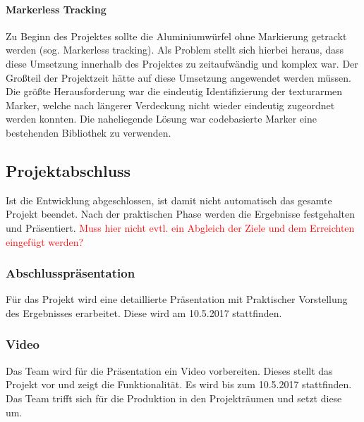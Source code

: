 \paragraph{Markerless Tracking}
 Zu Beginn des Projektes sollte die Aluminiumwürfel ohne Markierung getrackt werden (sog. Markerless tracking). Als Problem stellt sich hierbei heraus, dass diese Umsetzung innerhalb des Projektes zu zeitaufwändig und komplex war. Der Großteil der Projektzeit hätte auf diese Umsetzung angewendet werden müssen. Die größte Herausforderung war die eindeutig Identifizierung der texturarmen Marker, welche nach längerer Verdeckung nicht wieder eindeutig zugeordnet werden konnten. Die naheliegende Lösung war codebasierte Marker eine bestehenden Bibliothek zu verwenden.


\subsection{Projektabschluss}
Ist die Entwicklung abgeschlossen, ist damit nicht automatisch das gesamte Projekt beendet. Nach der praktischen Phase werden die Ergebnisse festgehalten und Präsentiert. \textcolor{red}{Muss hier nicht evtl. ein Abgleich der Ziele und dem Erreichten eingefügt werden?}
\subsubsection{Abschlusspräsentation}
Für das Projekt wird eine detaillierte Präsentation mit Praktischer Vorstellung des Ergebnisses erarbeitet. Diese wird am 10.5.2017 stattfinden.
 \subsubsection{Video}
Das Team wird für die Präsentation ein Video vorbereiten. Dieses stellt das Projekt vor und zeigt die Funktionalität. Es wird bis zum 10.5.2017 stattfinden. Das Team trifft sich für die Produktion in den Projekträumen und setzt diese um.


